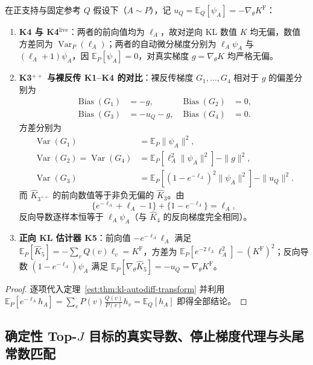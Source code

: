 \documentclass[lang=cn,scheme=chinese,openany]{elegantbook}
\newcommand{\E}{\mathbb E}
\newcommand{\Var}{\operatorname{Var}}
\begin{document}
\begin{theorem}
\label{est:thm:k4}
在正支持与固定参考 $Q$ 假设下（$A\sim P$），记 $u_Q=\E_Q[\psi_A]=-\nabla_\theta K^{\mathrm F}$：
\begin{enumerate}
\item \textbf{K4 与 K4$^{\mathrm{live}}$}：两者的前向值均为 $\ell_A$，故对逆向 KL 数值 $K$ 均无偏，数值方差同为 $\Var_P(\ell_A)$；两者的自动微分梯度分别为 $\ell_A\psi_A$ 与 $(\ell_A+1)\psi_A$，因 $\E_P[\psi_A]=0$，对真实梯度 $g=\nabla_\theta K$ 均严格无偏。
\item \textbf{K3$^{++}$ 与裸反传 K1--K4 的对比}：裸反传梯度 $G_1,\ldots,G_4$ 相对于 $g$ 的偏差分别为
\begin{align*}
\operatorname{Bias}(G_1)&=-g,& \operatorname{Bias}(G_2)&=0,\\
\operatorname{Bias}(G_3)&=-u_Q-g,& \operatorname{Bias}(G_4)&=0.
\end{align*}
方差分别为
\begin{align*}
\Var(G_1)&=\E_P\|\psi_A\|^2,\\
\Var(G_2)=\Var(G_4)&=\E_P[\ell_A^2\|\psi_A\|^2]-\|g\|^2,\\
\Var(G_3)&=\E_P[(1-e^{-\ell_A})^2\|\psi_A\|^2]-\|u_Q\|^2.
\end{align*}
而 $\widehat K_{3^{++}}$ 的前向数值等于非负无偏的 $\widehat K_3$。由
\begin{equation*}
\{e^{-\ell_A}+\ell_A-1\}+\{1-e^{-\ell_A}\}=\ell_A,
\end{equation*}
反向导数逐样本恒等于 $\ell_A\psi_A$（与 $\widehat K_4$ 的反向梯度完全相同）。
\item \textbf{正向 KL 估计器 K5}：前向值 $-e^{-\ell_A}\ell_A$ 满足 $\E_P[\widehat K_5]=-\sum_v Q(v)\ell_v=K^{\mathrm F}$，方差为 $\E_P[e^{-2\ell_A}\ell_A^2]-(K^{\mathrm F})^2$；反向导数 $(1-e^{-\ell_A})\psi_A$ 满足 $\E_P[\nabla_\theta\widehat K_5]=-u_Q=\nabla_\theta K^{\mathrm F}$。
\end{enumerate}
\end{theorem}
\begin{proof}
逐项代入定理~\ref{est:thm:kl-autodiff-transform} 并利用 $\E_P[e^{-\ell_A}h_A]=\sum_v P(v)\frac{Q(v)}{P(v)}h_v=\E_Q[h_A]$ 即得全部结论。
\end{proof}

\subsection{确定性 Top-\texorpdfstring{$J$}{J} 目标的真实导数、停止梯度代理与头尾常数匹配}
\label{est:sec:kl-k4-hets}
\end{document}
